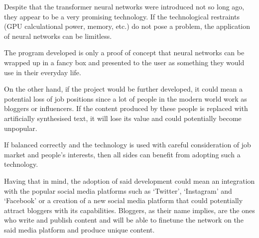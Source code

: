 \documentclass[12pt]{report}
\begin{document}
Despite that the transformer neural networks were introduced not so long ago, they appear to be a very promising technology. If the
technological restraints (GPU calculational power, memory, etc.) do not pose a problem, the application of neural networks can be
limitless.

The program developed is only a proof of concept that neural networks can be wrapped up in a fancy box and presented to the user as something
they would use in their everyday life.

On the other hand, if the project would be further developed, it could mean a potential loss of job positions since a lot of people in the modern
world work as bloggers or influencers. If the content produced by these people is replaced with artificially synthesised text, it will lose its
value and could potentially become unpopular.

If balanced correctly and the technology is used with careful consideration of job market and people's interests, then
all sides can benefit from adopting such a technology.

Having that in mind, the adoption of said development could mean an integration with the popular social media platforms such as `Twitter',
`Instagram' and `Facebook' or a creation of a new social media platform that could potentially attract bloggers with its capabilities.
Bloggers, as their name implies, are the ones who write and publish content and will be able to finetune the network on the said media platform and produce
unique content.






{}

\end{document}
